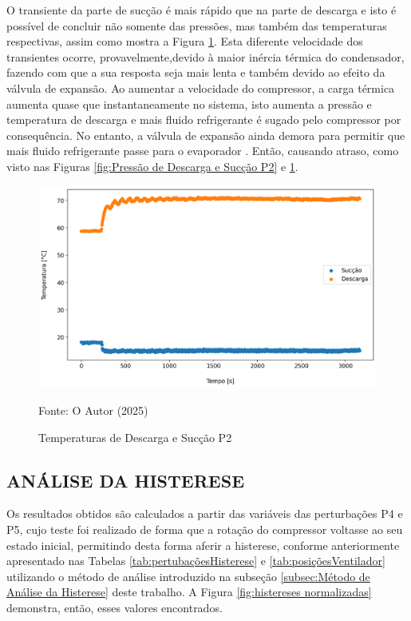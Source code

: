 O transiente da parte de sucção é mais rápido que na parte de descarga e isto é possível de concluir não somente das pressões, mas também das temperaturas respectivas, assim como mostra a Figura \ref{fig:Temperaturas de Sucção e Descarga P2}. Esta diferente velocidade dos transientes ocorre, provavelmente,devido à maior inércia térmica do condensador, fazendo com que a sua resposta seja mais lenta e também devido ao efeito da válvula de expansão. Ao aumentar a velocidade do compressor, a carga térmica aumenta quase que instantaneamente no sistema, isto aumenta a pressão e temperatura de descarga e mais  fluido refrigerante é sugado pelo compressor por consequência. No entanto, a válvula de expansão ainda demora para permitir que mais fluido refrigerante passe para o evaporador \cite{CHEN20081368}. Então, causando atraso, como visto nas Figuras \ref{fig:Pressão de Descarga e Sucção P2} e \ref{fig:Temperaturas de Sucção e Descarga P2}. 

\begin{figure}[h]
    \centering
    \includegraphics[width=1\linewidth]{FigurasdoTexto/Temperaturas de Sucção e Descarga P2.png}
    \caption{Temperaturas de Descarga e Sucção P2}
    \label{fig:Temperaturas de Sucção e Descarga P2}
    {\footnotesize Fonte: O Autor (2025)}
\end{figure}
\newpage
\subsection{\MakeUppercase{Análise da Histerese}}

 Os resultados obtidos são calculados a partir das variáveis das perturbações P4 e P5, cujo teste foi realizado de forma que a rotação do compressor voltasse ao seu estado inicial, permitindo desta forma aferir a histerese, conforme anteriormente apresentado nas Tabelas \ref{tab:pertubaçõesHisterese} e \ref{tab:posiçõesVentilador} utilizando o método de análise introduzido na subseção \ref{subsec:Método de Análise da Histerese} deste trabalho. A Figura \ref{fig:histereses normalizadas} demonstra, então, esses valores encontrados.

